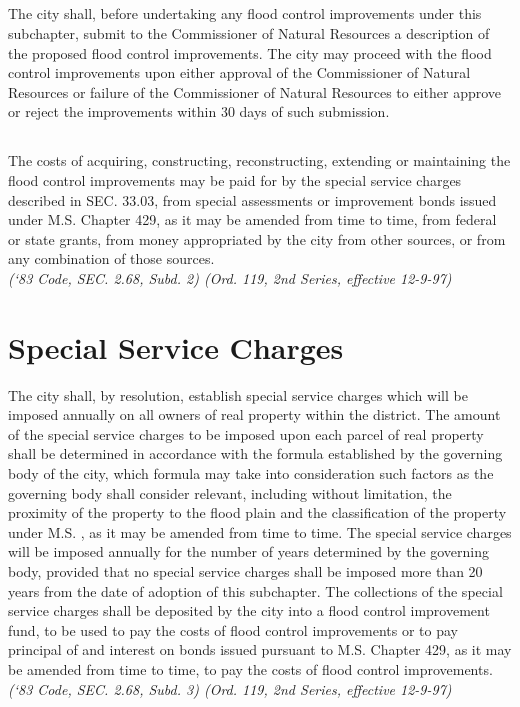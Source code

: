 \subsection{}
The city shall, before undertaking any flood control improvements under this subchapter, submit to the Commissioner of Natural Resources a description of the proposed flood control improvements.  The city may proceed with the flood control improvements upon either  approval of the Commissioner of Natural Resources or failure of the Commissioner of Natural Resources to either approve or reject the improvements within 30 days of such submission.
\subsection{}
The costs of acquiring, constructing, reconstructing, extending or maintaining the flood control improvements may be paid for by the special service charges described in SEC. 33.03, from special assessments or improvement bonds issued under M.S. Chapter 429, as it may be amended from time to time, from federal or state grants, from money appropriated by the city from other sources, or from any combination of those sources.\\
\emph{(‘83 Code, SEC. 2.68, Subd. 2)  (Ord. 119, 2nd Series, effective 12-9-97)}
\section{Special Service Charges}
The city shall, by resolution, establish special service charges which will be imposed annually on all owners of real property within the district. The amount of the special service charges to be imposed upon each parcel of real property shall be determined in accordance with the formula established by the governing body of the city, which formula may take into consideration such factors as the governing body shall consider relevant, including without limitation, the proximity of the property to the flood plain and the classification of the property under M.S. , as it may be amended from time to time. The special service charges will be imposed annually for the number of years determined by the governing body, provided that no special service charges shall be imposed more than 20 years from the date of adoption of this subchapter. The collections of the special service charges shall be deposited by the city into a flood control improvement fund, to be used to pay the costs of flood control improvements or to pay principal of and interest on bonds issued pursuant to M.S. Chapter 429, as it may be amended from time to time, to pay the costs of flood control improvements.\\
\emph{(‘83 Code, SEC. 2.68, Subd. 3)  (Ord. 119, 2nd Series, effective 12-9-97)}\\

